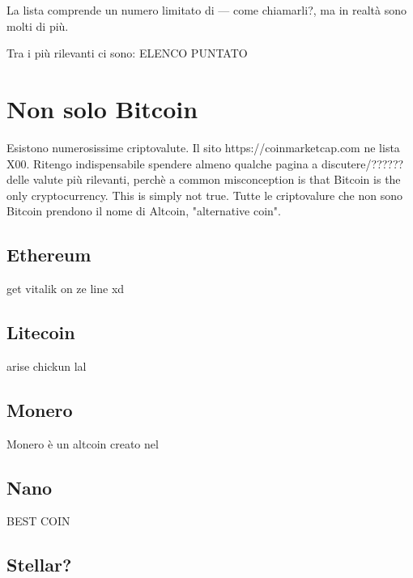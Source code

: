 \documentclass {article}
\begin{document}
La lista comprende un numero limitato di --- come chiamarli?, ma in realtà sono molti di più.

Tra i più rilevanti ci sono: ELENCO PUNTATO





\section {Non solo Bitcoin}



Esistono numerosissime criptovalute. Il sito https://coinmarketcap.com ne lista X00. Ritengo indispensabile spendere almeno qualche pagina a discutere/?????? delle valute più rilevanti, perchè a common misconception is that Bitcoin is the only cryptocurrency. This is simply not true. Tutte le criptovalure che non sono Bitcoin prendono il nome di Altcoin, "alternative coin".



\subsection {Ethereum}



get vitalik on ze line xd



\subsection {Litecoin}



arise chickun lal



\subsection {Monero}



Monero è un altcoin creato nel



\subsection {Nano}



BEST COIN



\subsection {Stellar?}
\end{document}
